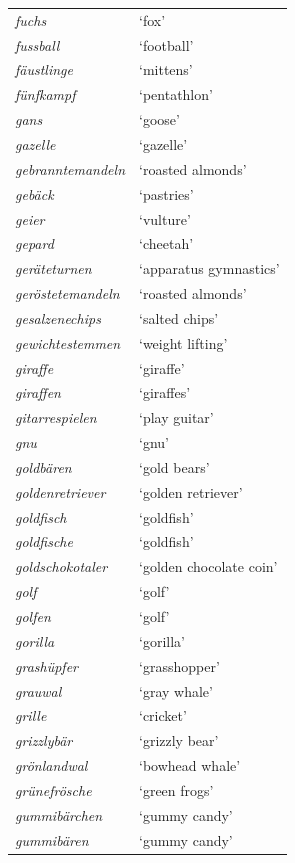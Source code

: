 \begin{longtable}{ll}
\textit{fuchs} & `fox' \\
\textit{fussball} & `football' \\
\textit{fäustlinge} & `mittens' \\
\textit{fünfkampf} & `pentathlon' \\
\textit{gans} & `goose' \\
\textit{gazelle} & `gazelle' \\
\textit{gebranntemandeln} & `roasted almonds' \\
\textit{gebäck} & `pastries' \\
\textit{geier} & `vulture' \\
\textit{gepard} & `cheetah' \\
\textit{geräteturnen} & `apparatus gymnastics' \\
\textit{geröstetemandeln} & `roasted almonds' \\
\textit{gesalzenechips} & `salted chips' \\
\textit{gewichtestemmen} & `weight lifting' \\
\textit{giraffe} & `giraffe' \\
\textit{giraffen} & `giraffes' \\
\textit{gitarrespielen} & `play guitar' \\
\textit{gnu} & `gnu' \\
\textit{goldbären} & `gold bears' \\
\textit{goldenretriever} & `golden retriever' \\
\textit{goldfisch} & `goldfish' \\
\textit{goldfische} & `goldfish' \\
\textit{goldschokotaler} & `golden chocolate coin' \\
\textit{golf} & `golf' \\
\textit{golfen} & `golf' \\
\textit{gorilla} & `gorilla' \\
\textit{grashüpfer} & `grasshopper' \\
\textit{grauwal} & `gray whale' \\
\textit{grille} & `cricket' \\
\textit{grizzlybär} & `grizzly bear' \\
\textit{grönlandwal} & `bowhead whale' \\
\textit{grünefrösche} & `green frogs' \\
\textit{gummibärchen} & `gummy candy' \\
\textit{gummibären} & `gummy candy' \\

\end{longtable}
